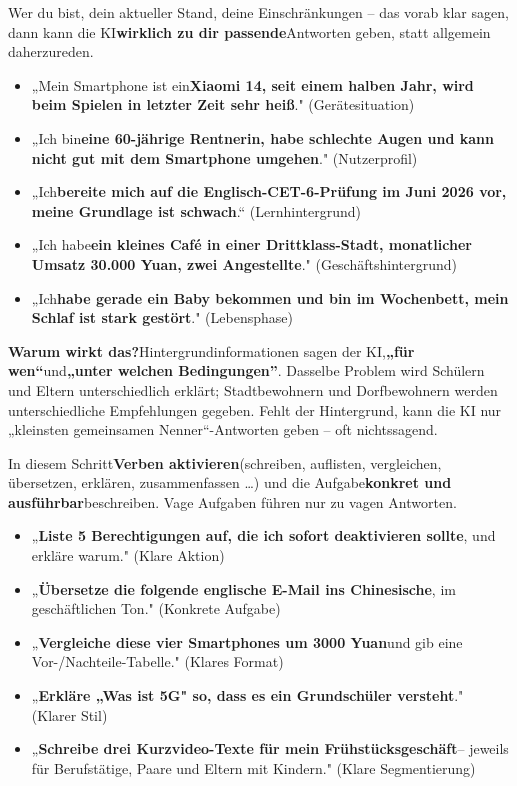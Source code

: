 
Wer du bist, dein aktueller Stand, deine Einschränkungen – das vorab klar sagen, dann kann die KI\textbf{wirklich zu dir passende}Antworten geben, statt allgemein daherzureden.


\begin{itemize}
  \item „Mein Smartphone ist ein\textbf{Xiaomi 14, seit einem halben Jahr, wird beim Spielen in letzter Zeit sehr heiß}." (Gerätesituation)
  \item „Ich bin\textbf{eine 60-jährige Rentnerin, habe schlechte Augen und kann nicht gut mit dem Smartphone umgehen}." (Nutzerprofil)
  \item „Ich\textbf{bereite mich auf die Englisch-CET-6-Prüfung im Juni 2026 vor, meine Grundlage ist schwach}.“ (Lernhintergrund)
  \item „Ich habe\textbf{ein kleines Café in einer Drittklass-Stadt, monatlicher Umsatz 30.000 Yuan, zwei Angestellte}." (Geschäftshintergrund)
  \item „Ich\textbf{habe gerade ein Baby bekommen und bin im Wochenbett, mein Schlaf ist stark gestört}." (Lebensphase)
\end{itemize}

\textbf{Warum wirkt das?}Hintergrundinformationen sagen der KI,\textbf{„für wen“}und\textbf{„unter welchen Bedingungen”}. Dasselbe Problem wird Schülern und Eltern unterschiedlich erklärt; Stadtbewohnern und Dorfbewohnern werden unterschiedliche Empfehlungen gegeben. Fehlt der Hintergrund, kann die KI nur „kleinsten gemeinsamen Nenner“-Antworten geben – oft nichtssagend.


In diesem Schritt\textbf{Verben aktivieren}(schreiben, auflisten, vergleichen, übersetzen, erklären, zusammenfassen …) und die Aufgabe\textbf{konkret und ausführbar}beschreiben. Vage Aufgaben führen nur zu vagen Antworten.


\begin{itemize}
  \item „\textbf{Liste 5 Berechtigungen auf, die ich sofort deaktivieren sollte}, und erkläre warum." (Klare Aktion)
  \item „\textbf{Übersetze die folgende englische E-Mail ins Chinesische}, im geschäftlichen Ton." (Konkrete Aufgabe)
  \item „\textbf{Vergleiche diese vier Smartphones um 3000 Yuan}und gib eine Vor-/Nachteile-Tabelle." (Klares Format)
  \item „\textbf{Erkläre „Was ist 5G" so, dass es ein Grundschüler versteht}." (Klarer Stil)
  \item „\textbf{Schreibe drei Kurzvideo-Texte für mein Frühstücksgeschäft}– jeweils für Berufstätige, Paare und Eltern mit Kindern." (Klare Segmentierung)
\end{itemize}

